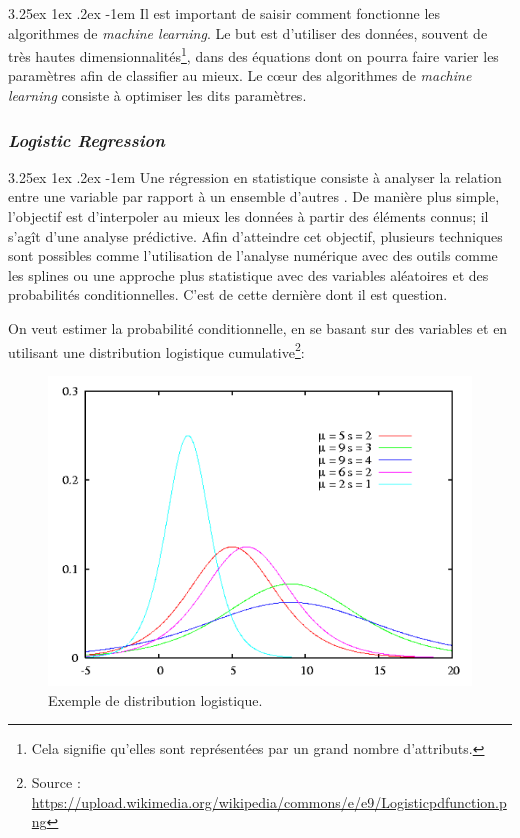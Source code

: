 \documentclass[a4paper, 11pt]{article}
\makeatletter
\renewcommand\paragraph{\@startsection{paragraph}{5}{\z@}%
  {3.25ex \@plus1ex \@minus.2ex}%
  {-1em}%
  {\normalfont\normalsize\bfseries}}
\makeatother
\begin{document}
\paragraph{}
Il est important de saisir comment fonctionne les algorithmes de \textit{machine learning}. 
Le but est d'utiliser des données, souvent de très hautes dimensionnalités\footnote{Cela signifie qu'elles 
sont représentées par un grand nombre d'attributs.}, dans des équations dont on pourra faire varier 
les paramètres afin de classifier au mieux. Le cœur des algorithmes de \textit{machine learning} 
consiste à optimiser les dits paramètres.

\subsubsection{\textit{Logistic Regression}} \label{section régression logistique}
\paragraph{}
Une régression en statistique consiste à analyser la relation entre une variable par rapport à un ensemble d'autres 
\cite{wikipedia_regression}. De manière plus simple, l'objectif est d'interpoler au mieux les données à partir des éléments connus; il s'agît d'une analyse prédictive. Afin d'atteindre cet objectif, plusieurs techniques sont possibles comme l'utilisation de l'analyse numérique avec des outils comme les splines\cite{spline_schoenberg_isaac} ou une approche plus statistique avec des variables aléatoires et des probabilités conditionnelles. C'est de cette dernière dont il est question.

On veut estimer la probabilité conditionnelle, en se basant sur des variables et 
en utilisant une distribution logistique cumulative\footnote{Source : \url{https://upload.wikimedia.org/wikipedia/commons/e/e9/Logisticpdfunction.png}}:
\begin{figure}[h!]
	\centering
	\includegraphics[scale=0.75]{images/logistic_distribution}
	\caption{Exemple de distribution logistique.}
\end{figure}
\end{document}

